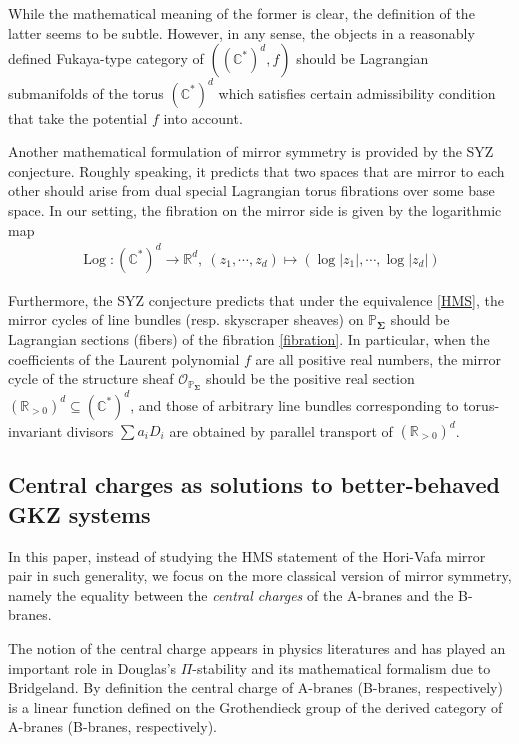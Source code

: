 \documentclass[11pt,reqno]{amsart}
\def\C {{\mathbb C}}
\def\CC {{\mathbb C}}
\def\R {{\mathbb R}}
\def\PP {{\mathbb P}}
\theoremstyle{definition}
\numberwithin{equation}{section}
\begin{document}
\smallskip

While the mathematical meaning of the former is clear, the definition of the latter seems to be subtle. However, in any sense, the objects in a reasonably defined Fukaya-type category of $((\C^*)^d,f)$ should be Lagrangian submanifolds of the torus $(\CC^*)^d$ which satisfies certain admissibility condition that take the potential $f$ into account.

\smallskip

Another mathematical formulation of mirror symmetry is provided by the SYZ conjecture. Roughly speaking, it predicts that two spaces that are mirror to each other should arise from dual special Lagrangian torus fibrations over some base space. In our setting, the fibration on the mirror side is given by the logarithmic map
\begin{align}\label{fibration}
	\operatorname{Log}:(\CC^*)^d\rightarrow \R^d, \ (z_1,\cdots,z_d)\mapsto (\log|z_1|,\cdots,\log|z_d|)
\end{align}

\smallskip

Furthermore, the SYZ conjecture predicts that under the equivalence \eqref{HMS}, the mirror cycles of line bundles (resp. skyscraper sheaves) on $\PP_{\mathbf{\Sigma}}$ should be Lagrangian sections (fibers) of the fibration \eqref{fibration}. In particular, when the coefficients of the Laurent polynomial $f$ are all positive real numbers, the mirror cycle of the structure sheaf $\mathcal{O}_{\PP_{\mathbf{\Sigma}}}$ should be the positive real section $(\R_{>0})^d\subseteq (\CC^*)^d$, and those of arbitrary line bundles corresponding to torus-invariant divisors $\sum a_i D_i$ are obtained by parallel transport of $(\R_{>0})^d$.


\subsection{Central charges as solutions to better-behaved GKZ systems}\label{intro-central charges}

In this paper, instead of studying the HMS statement of the Hori-Vafa mirror pair in such generality, we focus on the more classical version of mirror symmetry, namely the equality between the \textit{central charges} of the A-branes and the B-branes.

\smallskip

The notion of the central charge appears in physics literatures and has played an important role in Douglas's $\Pi$-stability \cite{Douglas} and its mathematical formalism \cite{Bridgeland} due to Bridgeland. By definition the central charge of A-branes (B-branes, respectively) is a linear function defined on the Grothendieck group of the  derived category of A-branes (B-branes, respectively). 
\end{document}
